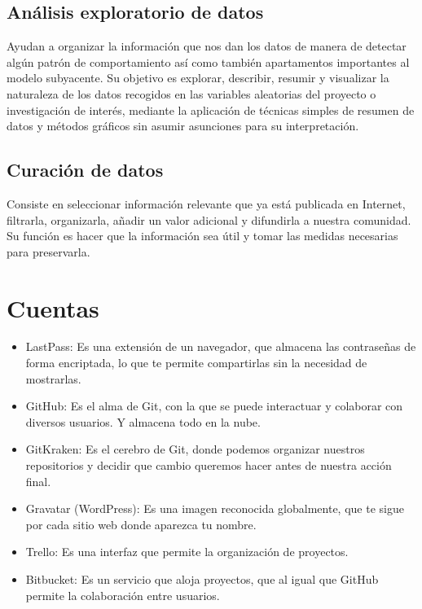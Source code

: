 \documentclass[12pt,letterpaper]{article}
\begin{document}
\subsection*{Análisis exploratorio de datos}
Ayudan a organizar la información que nos dan los datos de manera de detectar
algún patrón de comportamiento así como también apartamentos importantes al
modelo subyacente.
\citep{orella_analisis_exploratorio}
Su objetivo es explorar, describir, resumir y visualizar la naturaleza de los
datos recogidos en las variables aleatorias del proyecto o investigación de
interés, mediante la aplicación de técnicas simples de resumen de datos y
métodos gráficos sin asumir asunciones para su interpretación.
\citep{heix_bios_analisis_exploratorio}

\subsection*{Curación de datos}
Consiste en seleccionar informaci\'on relevante que ya está publicada en
Internet, filtrarla, organizarla, añadir un valor adicional y difundirla a
nuestra comunidad.
\citep{duro_2017}
Su función es hacer que la información sea útil y tomar las medidas necesarias
para preservarla.
\citep{it_user_2020}

\section*{Cuentas}
\begin{itemize}
\item LastPass: Es una extensión de un navegador, que almacena las contraseñas de forma encriptada, lo que te permite compartirlas sin la necesidad de mostrarlas.
\item GitHub: Es el alma de Git, con la que se puede interactuar y colaborar con diversos usuarios. Y almacena todo en la nube.
\item GitKraken: Es el cerebro de Git, donde podemos organizar nuestros repositorios y decidir que cambio queremos hacer antes de nuestra acción final.
\item Gravatar (WordPress): Es una imagen reconocida globalmente, que te sigue por cada sitio web donde aparezca tu nombre.
\item Trello: Es una interfaz que permite la organización de proyectos.
\item Bitbucket: Es un servicio que aloja proyectos, que al igual que GitHub permite la colaboración entre usuarios.
\end{itemize}

 

\end{document}
